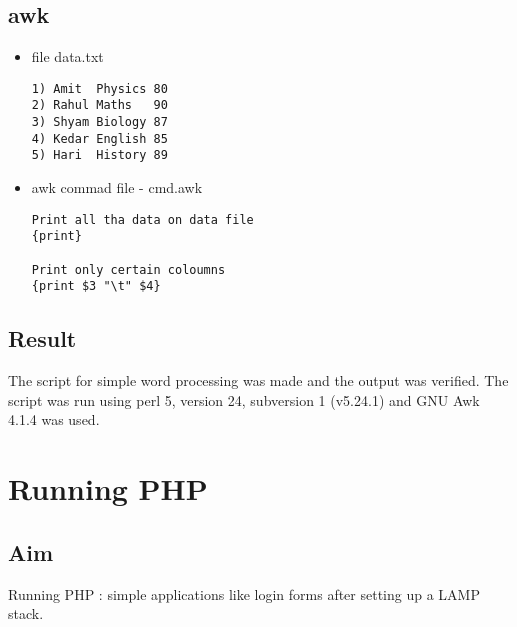 \documentclass{article}
\begin{document}
\subsection{awk}
\begin{itemize}
\item file data.txt
\begin{verbatim}
1) Amit  Physics 80
2) Rahul Maths   90
3) Shyam Biology 87
4) Kedar English 85
5) Hari  History 89
\end{verbatim}
\item awk commad file - cmd.awk
\begin{verbatim}
Print all tha data on data file
{print}

Print only certain coloumns
{print $3 "\t" $4}
\end{verbatim}
\end{itemize}

\subsection{Result}
The script for simple word processing was made and the output was verified. The script was run using perl 5, version 24, subversion 1 (v5.24.1) and GNU Awk 4.1.4 was used. 

\begin{refsection}
\cite{perlbook}
\cite{perlweb}
\printbibliography
\end{refsection}

\newpage
\section{Running PHP}

\subsection{Aim}
Running PHP : simple applications like login forms after setting up a LAMP stack.
\end{document}
